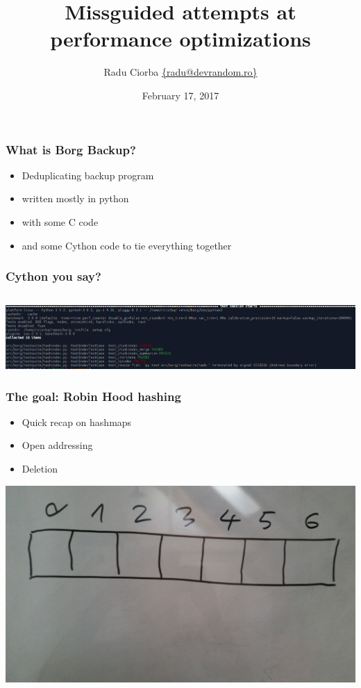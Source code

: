 \documentclass{beamer}
\title[Robin Hood Hashing]{Missguided attempts at performance optimizations} %
\author{Radu Ciorba \href{mailto:radu@devrandom.ro}{\{radu@devrandom.ro\}}} %
\date{February 17, 2017} %
\begin{document}
\begin{frame}
  \titlepage %
\end{frame}

\begin{frame}
  \frametitle{What is Borg Backup?}
  \begin{itemize}
  \item Deduplicating backup program
  \item written mostly in python
  \item with some C code
  \item and some Cython code to tie everything together
  \end{itemize}
\end{frame}

\begin{frame}
  \frametitle{Cython you say?}
  \inputminted[fontsize=\footnotesize]{python}{snippets/example.pyx}
\end{frame}


\begin{frame}
 \begin{center}
 \includegraphics[scale=0.245,keepaspectratio=true]{./segfault.png}
 \end{center}
\end{frame}

\begin{frame}
  \frametitle{The goal: Robin Hood hashing}
  \begin{itemize}
  \item Quick recap on hashmaps
  \item Open addressing
  \item Deletion
  \end{itemize}
\end{frame}


\begin{frame}
 \begin{center}
 \includegraphics[scale=0.06,keepaspectratio=true]{./images/1.jpg}
 \end{center}
\end{frame}
\end{document}
